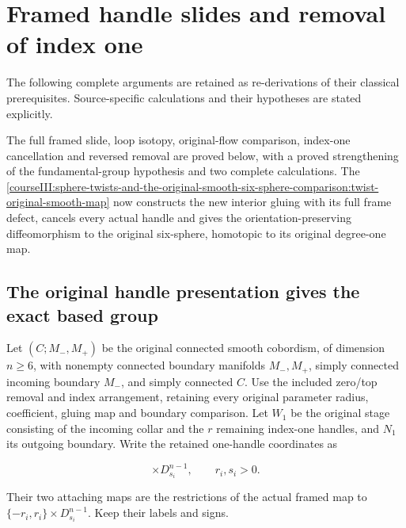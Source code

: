 \section{Framed handle slides and removal of index one}\label{courseIII:framed-handle-slides-and-index-one-removal:section}

The following complete arguments are retained as re-derivations of their classical prerequisites. Source-specific calculations and their hypotheses are stated explicitly.

The full framed slide, loop isotopy, original-flow comparison, index-one cancellation and reversed removal are proved below, with a proved strengthening of the fundamental-group hypothesis and two complete calculations. The \cref{courseIII:sphere-twists-and-the-original-smooth-six-sphere-comparison:twist-original-smooth-map} now constructs the new interior gluing with its full frame defect, cancels every actual handle and gives the orientation-preserving diffeomorphism to the original six-sphere, homotopic to its original degree-one map.

\subsection{The original handle presentation gives the exact based group}
\label{courseIII:framed-handle-slides-and-index-one-removal:slide-original-group}

\label{courseIII:framed-handle-slides-and-index-one-removal:section-1}\label{courseIII:low-index-slides:1}

Let \((C;M_-,M_+)\) be the original connected smooth cobordism, of dimension \(n\geq6\), with nonempty connected boundary manifolds \(M_-,M_+\), simply connected incoming boundary \(M_-\), and simply connected \(C\). Use the included zero/top removal and index arrangement, retaining every original parameter radius, coefficient, gluing map and boundary comparison. Let \(W_1\) be the original stage consisting of the incoming collar and the \(r\) remaining index-one handles, and \(N_1\) its outgoing boundary. Write the retained one-handle coordinates as

\begin{equation}
[-r_i,r_i]\times D^{n-1}_{s_i},\qquad r_i,s_i>0.
 \label{courseIII:framed-handle-slides-and-index-one-removal:eq:1.1}
\end{equation}

Their two attaching maps are the restrictions of the actual framed map to \(\{-r_i,r_i\}\times D^{n-1}_{s_i}\). Keep their labels and signs.

